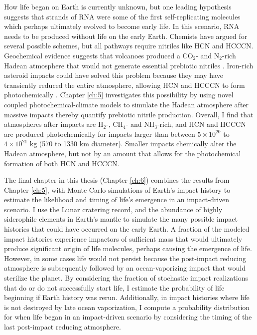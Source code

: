 How life began on Earth is currently unknown, but one leading hypothesis suggests that strands of RNA were some of the first self-replicating molecules which perhaps ultimately evolved to become early life. In this scenario, RNA needs to be produced without life on the early Earth. Chemists have argued for several possible schemes, but all pathways require nitriles like HCN and HCCCN. Geochemical evidence suggests that volcanoes produced a CO$_2$- and N$_2$-rich Hadean atmosphere that would not generate essential prebiotic nitriles \citep{Holland_1984}. Iron-rich asteroid impacts could have solved this problem because they may have transiently reduced the entire atmosphere, allowing HCN and HCCCN to form photochemically \citep{Zahnle_2020}. Chapter \ref{ch:5} investigates this possibility by using novel coupled photochemical-climate models to simulate the Hadean atmosphere after massive impacts thereby quantify prebiotic nitrile production. Overall, I find that atmospheres after impacts are H$_2$-, CH$_4$- and NH$_3$-rich, and HCN and HCCCN are produced photochemically for impacts larger than between $5 \times 10^{20}$ to $4 \times 10^{21}$ kg (570 to 1330 km diameter). Smaller impacts chemically alter the Hadean atmosphere, but not by an amount that allows for the photochemical formation of both HCN and HCCCN. 

The final chapter in this thesis (Chapter \ref{ch:6}) combines the results from Chapter \ref{ch:5}, with Monte Carlo simulations of Earth's impact history to estimate the likelihood and timing of life's emergence in an impact-driven scenario. I use the Lunar cratering record, and the abundance of highly siderophile elements in Earth's mantle to simulate the many possible impact histories that could have occurred on the early Earth. A fraction of the modeled impact histories experience impactors of sufficient mass that would ultimately produce significant origin of life molecules, perhaps causing the emergence of life. However, in some cases life would not persist because the post-impact reducing atmosphere is subsequently followed by an ocean-vaporizing impact that would sterilize the planet. By considering the fraction of stochastic impact realizations that do or do not successfully start life, I estimate the probability of life beginning if Earth history was rerun. Additionally, in impact histories where life is not destroyed by late ocean vaporization, I compute a probability distribution for when life began in an impact-driven scenario by considering the timing of the last post-impact reducing atmosphere.
